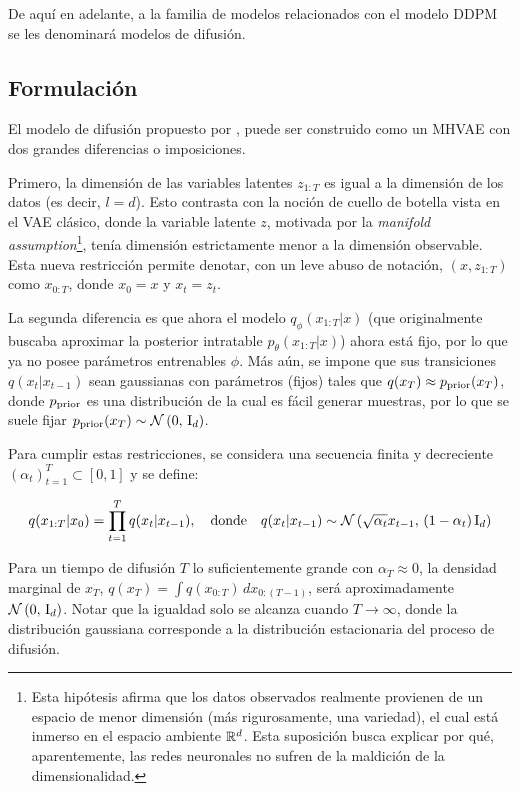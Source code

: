De aquí en adelante, a la familia de modelos relacionados con el modelo DDPM se les denominará modelos de difusión.

\subsection{Formulación}
\label{dm/discrete_dm/formulation}

El modelo de difusión propuesto por \cite{ho2020denoising}, puede ser construido como un MHVAE con dos grandes diferencias o imposiciones.

Primero, la dimensión de las variables latentes $z_{1:T}$ es igual a la dimensión de los datos (es decir, $l=d$). Esto contrasta con la noción de cuello de botella vista en el VAE clásico, donde la variable latente $z$, motivada por la \textit{manifold assumption}\footnote{Esta hipótesis afirma que los datos observados realmente provienen de un espacio de menor dimensión (más rigurosamente, una variedad), el cual está inmerso en el espacio ambiente $\mathbb{R}^d$. Esta suposición busca explicar por qué, aparentemente, las redes neuronales no sufren de la maldición de la dimensionalidad.}, tenía dimensión estrictamente menor a la dimensión observable. Esta nueva restricción permite denotar, con un leve abuso de notación, $(x, z_{1:T})$ como $x_{0:T}$, donde $x_0=x$ y $x_t=z_t$.

La segunda diferencia es que ahora el modelo $q_\phi(x_{1:T}|x)$ (que originalmente buscaba aproximar la posterior intratable $p_\theta(x_{1:T}|x)$) ahora está fijo, por lo que ya no posee parámetros entrenables $\phi$. Más aún, se impone que sus transiciones $q(x_t|x_{t-1})$ sean gaussianas con parámetros (fijos) tales que $q(x_T)\approx p_{\operatorname{prior}}(x_T)$, donde $p_{\operatorname{prior}}$ es una distribución de la cual es fácil generar muestras, por lo que se suele fijar $p_{\operatorname{prior}}(x_T)\sim\mathcal{N}\left(0,\,\operatorname{I}_{d}\right)$.

Para cumplir estas restricciones, se considera una secuencia finita y decreciente $(\alpha_t)_{t=1}^T\subset[0,1]$ y se define:

\begin{equation}
    \label{eq:ddpm_forward}
    q(x_{1:T}|x_0) = \prod_{t=1}^{T} q(x_t|x_{t-1}),
    \quad\text{donde}\quad
    q(x_t|x_{t-1}) \sim \mathcal{N}\left(\sqrt{\alpha_t} x_{t-1},\,(1-\alpha_t)\operatorname{I}_{d}\right)
\end{equation}

Para un tiempo de difusión $T$ lo suficientemente grande con $\alpha_T\approx 0$, la densidad marginal de $x_T$, $q(x_T)=\int q(x_{0:T})\, dx_{0:(T-1)}$, será aproximadamente $\mathcal{N}\left(0,\,\operatorname{I}_{d}\right)$. Notar que la igualdad solo se alcanza cuando $T\to\infty$, donde la distribución gaussiana corresponde a la distribución estacionaria del proceso de difusión.

